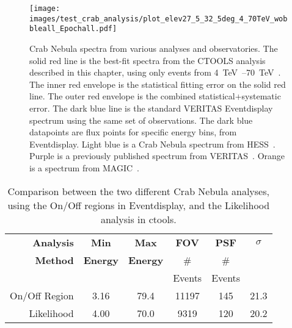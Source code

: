     
    
  \begin{figure}[h]
    \centering
    \texttt{[image: images/test\_crab\_analysis/plot\_elev27\_5\_32\_5deg\_4\_70TeV\_wobbleall\_Epochall.pdf]}
    \caption[Crab Test Spectrum]
    {
      Crab Nebula spectra from various analyses and observatories.
      The solid red line is the best-fit spectra from the CTOOLS analysis described in this chapter, using only events from \SIrange{4}{70}{\TeV{}}.
      The inner red envelope is the statistical fitting error on the solid red line.
      The outer red envelope is the combined statistical+systematic error.
      The dark blue line is the standard VERITAS Eventdisplay spectrum using the same set of observations.
      The dark blue datapoints are flux points for specific energy bins, from Eventdisplay.
      Light blue is a Crab Nebula spectrum from HESS~\cite{hess2006crab}.
      Purple is a previously published spectrum from VERITAS~\cite{veritas2015crab}.
      Orange is a spectrum from MAGIC~\cite{magic2015crab}.
    }
    \label{fig:crab_test_spectra}
  \end{figure}
    
  \begin{table}
    \centering
    \begin{tabular}{|r|c|c|c|c|c|}
      \hline
      \textbf{Analysis} & \textbf{Min}    & \textbf{Max}    & \textbf{FOV} & \textbf{PSF} & \textbf{$\sigma$} \\
      \textbf{Method}   & \textbf{Energy} & \textbf{Energy} &  \#          & \#           &                   \\
                        & \TeV{}          & \TeV{}          &  Events      & Events       &                   \\
      \hline 
      On/Off Region & 3.16 & 79.4 & 11197 & 145 & 21.3 \\
      Likelihood    & 4.00 & 70.0 & 9319  & 120 & 20.2 \\
      \hline 
    \end{tabular}
    \caption[Analysis Comparison]{
      Comparison between the two different Crab Nebula analyses, using the On/Off regions in Eventdisplay, and the Likelihood analysis in ctools.
    }
    \label{tab:crab_statistics}
  \end{table}

